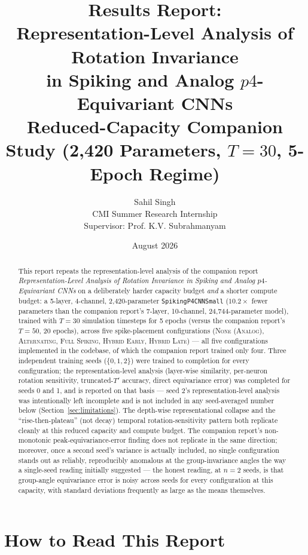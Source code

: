 \documentclass[11pt]{article}
\title{\Large Results Report:\\
Representation-Level Analysis of Rotation Invariance\\
in Spiking and Analog $p4$-Equivariant CNNs\\
\large Reduced-Capacity Companion Study (2{,}420 Parameters, $T{=}30$, 5-Epoch Regime)}
\author{Sahil Singh\\
CMI Summer Research Internship\\
Supervisor: Prof. K.V. Subrahmanyam}
\date{August 2026}
\newcommand{\None}{\textsc{None (Analog)}}
\newcommand{\Alternating}{\textsc{Alternating}}
\newcommand{\FullSpiking}{\textsc{Full Spiking}}
\newcommand{\HybridLate}{\textsc{Hybrid Late}}
\newcommand{\HybridEarly}{\textsc{Hybrid Early}}
\begin{document}
\maketitle

\begin{abstract}
This report repeats the representation-level analysis of the companion report
\emph{Representation-Level Analysis of Rotation Invariance in Spiking and Analog $p4$-Equivariant
CNNs} on a deliberately harder capacity budget \emph{and} a shorter compute budget: a 5-layer,
4-channel, 2{,}420-parameter \texttt{SpikingP4CNNSmall} ($10.2\times$ fewer parameters than the
companion report's 7-layer, 10-channel, 24{,}744-parameter model), trained with $T=30$ simulation
timesteps for 5 epochs (versus the companion report's $T=50$, 20 epochs), across five spike-placement
configurations (\None, \Alternating, \FullSpiking, \HybridEarly, \HybridLate) --- all five
configurations implemented in the codebase, of which the companion report trained only four. Three
independent training seeds ($\{0,1,2\}$) were trained to completion for every configuration; the
representation-level analysis (layer-wise similarity, per-neuron rotation sensitivity, truncated-$T'$
accuracy, direct equivariance error) was completed for seeds 0 and 1, and is reported on that basis ---
seed 2's representation-level analysis was intentionally left incomplete and is not included in any
seed-averaged number below (Section~\ref{sec:limitations}). The depth-wise representational collapse
and the ``rise-then-plateau'' (not decay) temporal rotation-sensitivity pattern both replicate cleanly
at this reduced capacity and compute budget. The companion report's non-monotonic peak-equivariance-error
finding does not replicate in the same direction; moreover, once a second seed's variance is actually
included, no single configuration stands out as reliably, reproducibly anomalous at the group-invariance
angles the way a single-seed reading initially suggested --- the honest reading, at $n=2$ seeds, is that
group-angle equivariance error is noisy across seeds for every configuration at this capacity, with
standard deviations frequently as large as the means themselves.
\end{abstract}

\tableofcontents

\section{How to Read This Report}
\end{document}
